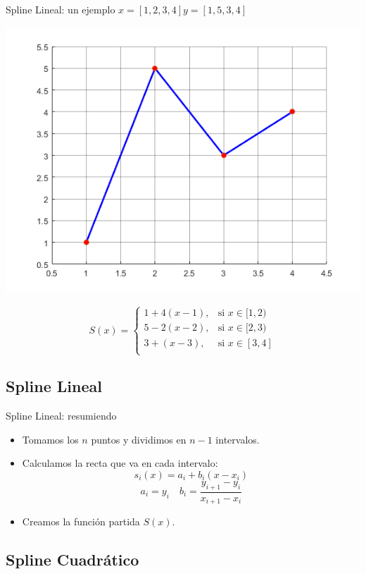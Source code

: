 \documentclass[xcolor=svgnames]{beamer} %
\theoremstyle{plain}
\theoremstyle{definition}
\begin{document}
\begin{frame}{Spline Lineal: un ejemplo}
  $x= [1, 2, 3, 4]$\hspace{10pt}$y=[1, 5, 3, 4]$ 
  \begin{center}
    \includegraphics[width=.45\linewidth]{splines/splineLin.png}  
  \end{center}
  \begin{tcolorbox}
	$$S(x) = \left\{
	\begin{array}{cc}
	  1 + 4(x-1) ,& \text{si } x \in [1,2) \\
	  5 - 2(x-2) ,& \text{si } x \in [2,3) \\
	  3 + (x-3)  ,& \text{si } x \in [3,4] \\
	\end{array} \right.$$		
  \end{tcolorbox}

\end{frame}

\subsection{Spline Lineal}
\begin{frame}{Spline Lineal: resumiendo}
	\begin{itemize}
	\item Tomamos los $n$ puntos y dividimos en $n-1$ intervalos.\pause
	\item Calculamos la recta que va en cada intervalo:\pause
	$$s_i(x) = a_i + b_i(x-x_i)  $$\pause
	$$\boxed{a_i = y_i} \quad \boxed{b_i = \frac{y_{i+1}-y_i}{x_{i+1}-x_i}}$$\pause
	\item Creamos la función partida $S(x)$.
	\end{itemize}

\end{frame}



\subsection{Spline Cuadrático}
\end{document}
